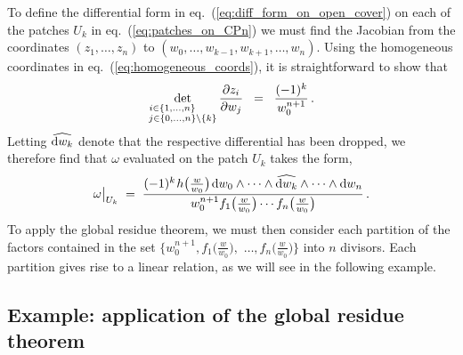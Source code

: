 \documentclass[dvipsnames,preprint,12pt,sort&compress]{elsarticle}
\def\d{{\rm d}}
\begin{document}
To define the differential form in eq.~(\ref{eq:diff_form_on_open_cover})
on each of the patches $U_k$ in eq.~(\ref{eq:patches_on_CPn}) we must find the
Jacobian from the coordinates $(z_1, \ldots, z_n)$ to $(w_0, \ldots, w_{k-1}, w_{k+1}, \ldots, w_n)$.
Using the homogeneous coordinates in eq.~(\ref{eq:homogeneous_coords}), it is straightforward to show that
\begin{equation}
\mathop{\mathrm{det}}_{\substack{i\in \{1,\ldots,n\} \phantom{\setminus\{ k \}} \\ j \in \{ 0, \ldots, n\}\setminus\{ k \} }}
\frac{\partial z_i}{\partial w_j} \hspace{2mm}=\hspace{2mm} \frac{(-1)^k}{w_0^{n+1}} \,.
\end{equation}
Letting $\widehat{\d w_k}$ denote that the respective differential has been dropped,
we therefore find that $\omega$ evaluated on the patch $U_k$ takes the form,
\begin{align}
\omega \big|_{U_k} \hspace{1mm}=\hspace{1mm} \frac{(-1)^k \hspace{0.3mm} h\big(\textstyle{\frac{w}{w_0}}\big)
\hspace{0.4mm} \d w_0\wedge\cdots\wedge \widehat{\d w_k} \wedge\cdots\wedge \d w_n}
{w_0^{n+1} f_1\big(\textstyle{\frac{w}{w_0}}\big)\cdots f_n\big(\textstyle{\frac{w}{w_0}}\big)}\,.
\end{align}
To apply the global residue theorem, we must then consider
each partition of the factors contained in the set
$\{w_0^{n+1}, f_1\big(\textstyle{\frac{w}{w_0}}\big),$ $\ldots, f_n\big(\textstyle{\frac{w}{w_0}}\big)\}$
into $n$ divisors. Each partition gives rise to a linear relation,
as we will see in the following example.

\subsection{Example: application of the global residue theorem}\label{sec:GRT_example}
\end{document}
